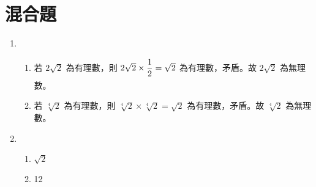 \documentclass[12pt]{article}
\newcommand*{\fraction}[2]{\rule[-.8\baselineskip]{0pt}{2\baselineskip}\dfrac{#1}{#2}}
\begin{document}
\section*{混合題}
\begin{enumerate}[align=left,leftmargin=*,labelsep=.6em,parsep=0ex]
  \item
  \begin{enumerate}[label=(\arabic*),align=left,leftmargin=*,labelsep=.4em]
    \item 若 $2\sqrt{2}$ 為有理數，則 $2\sqrt{2} \times \fraction{1}{2} = \sqrt{2}$ 為有理數，矛盾。故 $2\sqrt{2}$ 為無理數。
    \item 若 $\sqrt[4]{2}$ 為有理數，則 $\sqrt[4]{2} \times \sqrt[4]{2} = \sqrt{2}$ 為有理數，矛盾。故 $\sqrt[4]{2}$ 為無理數。
  \end{enumerate}
  \item
  \begin{enumerate}[label=(\arabic*),align=left,leftmargin=*,labelsep=.4em]
    \item $\sqrt{2}$
    \item 12
  \end{enumerate}
\end{enumerate}
\end{document}
